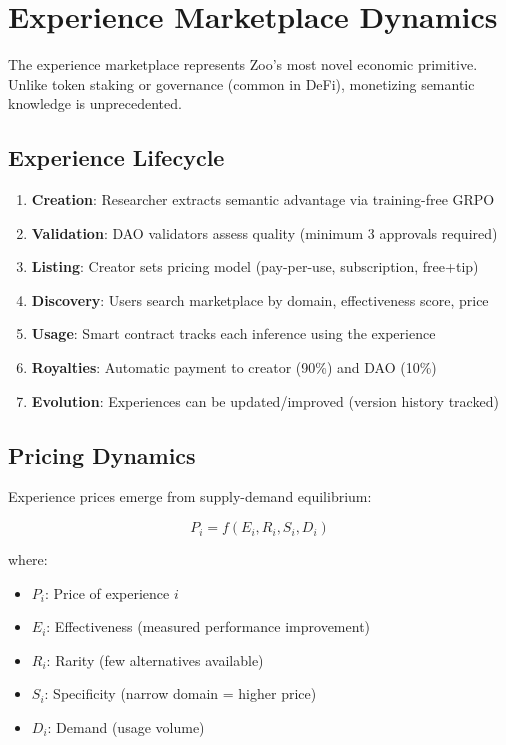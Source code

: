 \section{Experience Marketplace Dynamics}


The experience marketplace represents Zoo's most novel economic primitive. Unlike token staking or governance (common in DeFi), monetizing semantic knowledge is unprecedented.

\subsection{Experience Lifecycle}

\begin{enumerate}
\item \textbf{Creation}: Researcher extracts semantic advantage via training-free GRPO
\item \textbf{Validation}: DAO validators assess quality (minimum 3 approvals required)
\item \textbf{Listing}: Creator sets pricing model (pay-per-use, subscription, free+tip)
\item \textbf{Discovery}: Users search marketplace by domain, effectiveness score, price
\item \textbf{Usage}: Smart contract tracks each inference using the experience
\item \textbf{Royalties}: Automatic payment to creator (90\%) and DAO (10\%)
\item \textbf{Evolution}: Experiences can be updated/improved (version history tracked)
\end{enumerate}

\subsection{Pricing Dynamics}

Experience prices emerge from supply-demand equilibrium:

\begin{equation}
P_i = f(E_i, R_i, S_i, D_i)
\end{equation}

where:
\begin{itemize}
\item $P_i$: Price of experience $i$
\item $E_i$: Effectiveness (measured performance improvement)
\item $R_i$: Rarity (few alternatives available)
\item $S_i$: Specificity (narrow domain = higher price)
\item $D_i$: Demand (usage volume)
\end{itemize}

